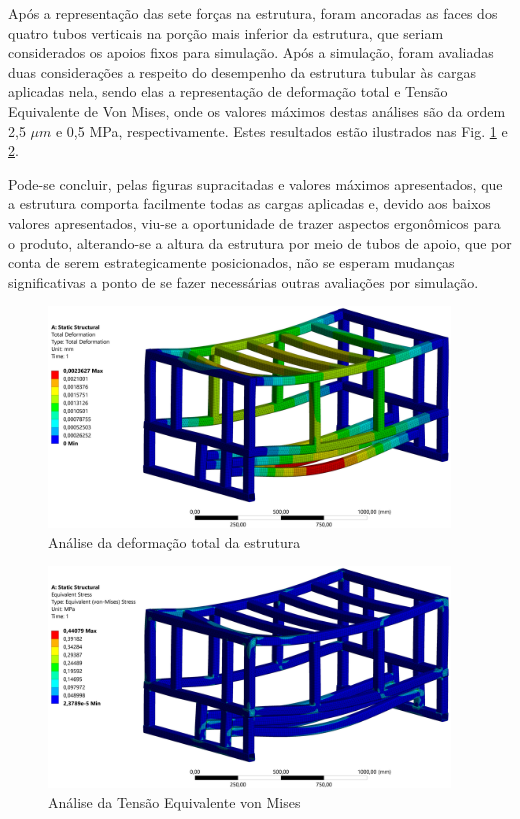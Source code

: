 Após a representação das sete forças na estrutura, foram ancoradas as faces dos quatro tubos verticais na porção mais inferior da estrutura, que seriam considerados os apoios fixos para simulação.
Após a simulação, foram avaliadas duas considerações a respeito do desempenho da estrutura tubular às cargas aplicadas nela, sendo elas a representação de deformação total e Tensão Equivalente de Von Mises, onde os valores máximos destas análises são da ordem 2,5 $\mu m$  e 0,5 MPa, respectivamente. Estes resultados estão ilustrados nas Fig. \ref{fig:deformation_tubular} e \ref{fig:Von_Mises_tubular}.


Pode-se concluir, pelas figuras supracitadas e valores máximos apresentados, que a estrutura comporta facilmente todas as cargas aplicadas e, devido aos baixos valores apresentados, viu-se a oportunidade de trazer aspectos ergonômicos para o produto, alterando-se a altura da estrutura por meio de tubos de apoio, que por conta de serem estrategicamente posicionados, não se esperam mudanças significativas a ponto de se fazer necessárias outras avaliações por simulação.


\begin{figure}[ht]
    \centering
    \includegraphics[width=0.95\textwidth]{figuras/estrutura/AnaliseEstaticaTubular/Deformation_Tubular.png}
    \caption{Análise da deformação total da estrutura }
    \label{fig:deformation_tubular}
\end{figure}


\begin{figure}[ht]
    \centering
    \includegraphics[width=0.95\textwidth]{figuras/estrutura/AnaliseEstaticaTubular/Von-Mises Stress_Tubular.png}
    \caption{Análise da Tensão Equivalente von Mises}
    \label{fig:Von_Mises_tubular}
\end{figure}


